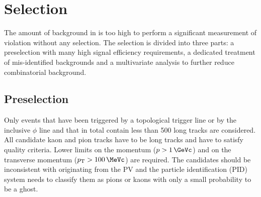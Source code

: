 
\section{Selection}
\label{sec:b02dd:selection}

The amount of background in \BdToDD is too high to perform a significant
measurement of \CP violation without any selection. The selection is divided
into three parts: a preselection with many high signal efficiency
requirements, a dedicated treatment of mis-identified backgrounds and a
multivariate analysis to further reduce combinatorial background.

\subsection{Preselection}
\label{sec:b02dd:selection:cuts}

Only events that have been triggered by a topological trigger line or by the
inclusive $\phi$ line and that in total contain less than \num{500} long
tracks are considered. All candidate kaon and pion tracks have to be long
tracks and have to satisfy quality criteria. Lower limits on the momentum ($p
> \SI{1}{\GeVc}$) and on the transverse momentum ($\pT > \SI{100}{\MeVc}$) are
required. The candidates should be inconsistent with originating from the PV
and the particle identification (PID) system needs to classify them as pions
or kaons with only a small probability to be a ghost.

